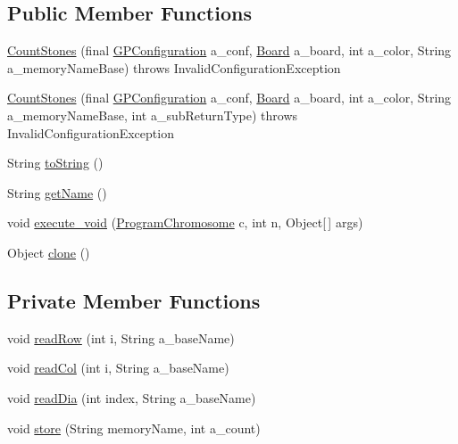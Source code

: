 \subsection*{Public Member Functions}
\begin{DoxyCompactItemize}
\item 
\hyperlink{classexamples_1_1gp_1_1tictactoe_1_1_count_stones_a4b01d18e5651dc9cbff23d9d81b43770}{Count\-Stones} (final \hyperlink{classorg_1_1jgap_1_1gp_1_1impl_1_1_g_p_configuration}{G\-P\-Configuration} a\-\_\-conf, \hyperlink{classexamples_1_1gp_1_1tictactoe_1_1_board}{Board} a\-\_\-board, int a\-\_\-color, String a\-\_\-memory\-Name\-Base)  throws Invalid\-Configuration\-Exception 
\item 
\hyperlink{classexamples_1_1gp_1_1tictactoe_1_1_count_stones_ae9b3e2d0a12497f0f6243a179e21d76c}{Count\-Stones} (final \hyperlink{classorg_1_1jgap_1_1gp_1_1impl_1_1_g_p_configuration}{G\-P\-Configuration} a\-\_\-conf, \hyperlink{classexamples_1_1gp_1_1tictactoe_1_1_board}{Board} a\-\_\-board, int a\-\_\-color, String a\-\_\-memory\-Name\-Base, int a\-\_\-sub\-Return\-Type)  throws Invalid\-Configuration\-Exception 
\item 
String \hyperlink{classexamples_1_1gp_1_1tictactoe_1_1_count_stones_add791e0b77fc42a5a8d5b479910824a1}{to\-String} ()
\item 
String \hyperlink{classexamples_1_1gp_1_1tictactoe_1_1_count_stones_a0098a9528cf3becae9fd8b1e62c0b6a8}{get\-Name} ()
\item 
void \hyperlink{classexamples_1_1gp_1_1tictactoe_1_1_count_stones_ab27c4bc5840d0dcd93479a36ed78d34e}{execute\-\_\-void} (\hyperlink{classorg_1_1jgap_1_1gp_1_1impl_1_1_program_chromosome}{Program\-Chromosome} c, int n, Object\mbox{[}$\,$\mbox{]} args)
\item 
Object \hyperlink{classexamples_1_1gp_1_1tictactoe_1_1_count_stones_a1757b7d96acd65ea32f18b0130419969}{clone} ()
\end{DoxyCompactItemize}
\subsection*{Private Member Functions}
\begin{DoxyCompactItemize}
\item 
void \hyperlink{classexamples_1_1gp_1_1tictactoe_1_1_count_stones_ad8d7ba8f0874c6968d9a15cf2be3ffcc}{read\-Row} (int i, String a\-\_\-base\-Name)
\item 
void \hyperlink{classexamples_1_1gp_1_1tictactoe_1_1_count_stones_a285b32e2294d241dda4611a335850300}{read\-Col} (int i, String a\-\_\-base\-Name)
\item 
void \hyperlink{classexamples_1_1gp_1_1tictactoe_1_1_count_stones_a23c5d5598673fc3cb7a2bcf7e45751a3}{read\-Dia} (int index, String a\-\_\-base\-Name)
\item 
void \hyperlink{classexamples_1_1gp_1_1tictactoe_1_1_count_stones_a3e8530929ef715c00a5c0527fc15e83e}{store} (String memory\-Name, int a\-\_\-count)
\end{DoxyCompactItemize}
